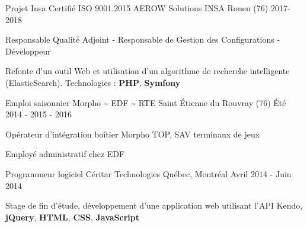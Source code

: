 

\begin{cventries}

  \cventry
	{Projet Insa Certifié ISO 9001.2015} %
	{AEROW Solutions} %
	{INSA Rouen (76)} %
	{2017-2018} %
	{
		\begin{cvitems} %
			\item {Responsable Qualité Adjoint - Responsable de Gestion des Configurations - Développeur}
			\item {Refonte d'un outil Web et utilisation d'un algorithme de recherche intelligente (ElasticSearch). Technologies : \textbf{PHP}, \textbf{Symfony}}
		\end{cvitems}
	}
	
	
	\cventry
	{Emploi saisonnier} %
	{Morpho  \textasciitilde{}  EDF  \textasciitilde{}  RTE} %
	{Saint Étienne du Rouvray (76)} %
	{Été 2014 - 2015 - 2016} %
	{
		\begin{cvitems} %
			\item {Opérateur d'intégration boîtier Morpho TOP, SAV terminaux de jeux }
			\item {Employé administratif chez EDF}
		\end{cvitems}
	}


  \cventry
    {Programmeur logiciel} %
    {Céritar Technologies} %
    {Québec, Montréal} %
    {Avril 2014 - Juin 2014} %
    {
      \begin{cvitems} %
        \item {Stage de fin d'étude, développement d'une application web utilisant l'API Kendo, \textbf{jQuery}, \textbf{HTML}, \textbf{CSS}, \textbf{JavaScript}}
      \end{cvitems}
    }

\end{cventries}
